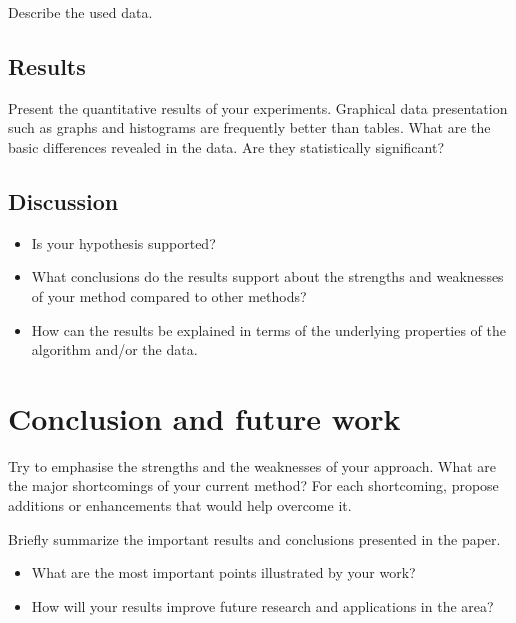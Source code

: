 \documentclass[runningheads,a4paper,11pt]{report}
\begin{document}
Describe the used data.

\section{Results}
\label{section:results}

Present the quantitative results of your experiments. Graphical data presentation such as graphs and histograms are frequently better than tables. What are the basic differences revealed in the data. Are they statistically significant?

\section{Discussion}
\label{section:discussion}

\begin{itemize}
	\item Is your hypothesis supported? 
	\item What conclusions do the results support about the strengths and weaknesses of your method compared to other methods? 
	\item How can the results be explained in terms of the underlying properties of the algorithm and/or the data. 
\end{itemize}



\chapter{Conclusion and future work}
\label{chapter:concl}

Try to emphasise the strengths and the weaknesses of your approach.
What are the major shortcomings of your current method? For each shortcoming, propose additions or enhancements that would help overcome it. 

Briefly summarize the important results and conclusions presented in the paper. 

\begin{itemize}
	\item What are the most important points illustrated by your work? 
	\item How will your results improve future research and applications in the area? 
\end{itemize}




\end{document}
